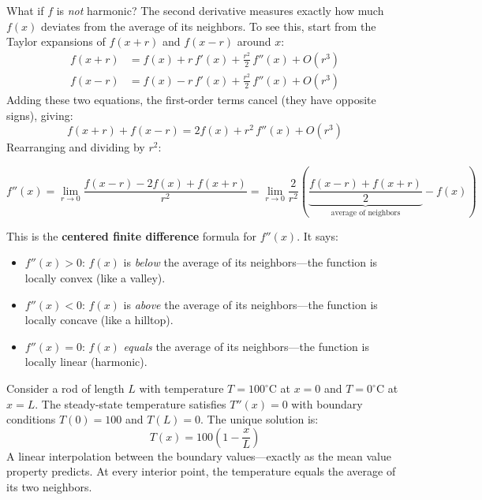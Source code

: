 \begin{notechapter}
What if $f$ is \emph{not} harmonic? The second derivative measures exactly
how much $f(x)$ deviates from the average of its neighbors. To see this,
start from the Taylor expansions of $f(x+r)$ and $f(x-r)$ around $x$:
\begin{align}
f(x+r) &= f(x) + r\,f'(x) + \frac{r^2}{2}\,f''(x) + O(r^3) \\
f(x-r) &= f(x) - r\,f'(x) + \frac{r^2}{2}\,f''(x) + O(r^3)
\end{align}
Adding these two equations, the first-order terms cancel (they have opposite
signs), giving:
\begin{equation}
f(x+r) + f(x-r) = 2f(x) + r^2\,f''(x) + O(r^3)
\end{equation}
Rearranging and dividing by $r^2$:

\begin{equation}
\label{harmonic-functions:eq:1d_laplacian_avg}
f''(x) = \lim_{r \to 0} \frac{f(x-r) - 2f(x) + f(x+r)}{r^2}
= \lim_{r \to 0} \frac{2}{r^2}\left(
  \underbrace{\frac{f(x-r) + f(x+r)}{2}}_{\text{average of neighbors}}
  - f(x)\right)
\end{equation}

This is the \textbf{centered finite difference} formula for $f''(x)$.
It says:
\begin{itemize}
    \item $f''(x) > 0$: $f(x)$ is \emph{below} the average of its
          neighbors---the function is locally convex (like a valley).
    \item $f''(x) < 0$: $f(x)$ is \emph{above} the average of its
          neighbors---the function is locally concave (like a hilltop).
    \item $f''(x) = 0$: $f(x)$ \emph{equals} the average of its
          neighbors---the function is locally linear (harmonic).
\end{itemize}

\begin{examplebox}[title=The 1D Boundary Value Problem]
Consider a rod of length $L$ with temperature $T = 100^\circ$C at $x = 0$
and $T = 0^\circ$C at $x = L$. The steady-state temperature satisfies
$T''(x) = 0$ with boundary conditions $T(0) = 100$ and $T(L) = 0$. The
unique solution is:
\[
T(x) = 100\left(1 - \frac{x}{L}\right)
\]
A linear interpolation between the boundary values---exactly as the mean
value property predicts. At every interior point, the temperature equals
the average of its two neighbors.
\end{examplebox}


\end{notechapter}
